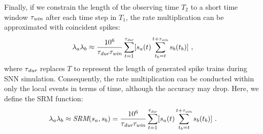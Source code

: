 Finally, if we constrain the length of the observing time $T_2$ to a short time window $\tau_\textit{\textrm{win}}$ after each time step in $T_1$, the rate multiplication can be approximated with coincident spikes:
\begin{equation}
\lambda_a \lambda_b \approx \frac{10^6}{\tau_{\textit{\textrm{dur}}} \tau_{\textit{\textrm{win}}}} \sum_{t=1}^{\tau_{\textit{\textrm{dur}}}} [s_a(t) \sum_{t_b=t}^{t+\tau_{\textit{\textrm{win}}}} s_b(t_b)]~,
\end{equation} 
where $\tau_{\textit{\textrm{dur}}}$ replaces $T$ to represent the length of generated spike trains during SNN simulation.
Consequently, the rate multiplication can be conducted within only the local events in terms of time, although the accuracy may drop.
Here, we define the SRM function:
\begin{equation}
\begin{aligned}
\lambda_a \lambda_b \approx \textit{\textrm{SRM}}(s_a, s_b) 
= \frac{10^6}{\tau_{\textit{\textrm{dur}}} \tau_{\textit{\textrm{win}}}} \sum_{t=1}^{\tau_{\textit{\textrm{dur}}}} [s_a(t) \sum_{t_b=t}^{t+\tau_{\textit{\textrm{win}}}} s_b(t_b)]~.
\end{aligned}
\label{equ:srm_define}
\end{equation} 

